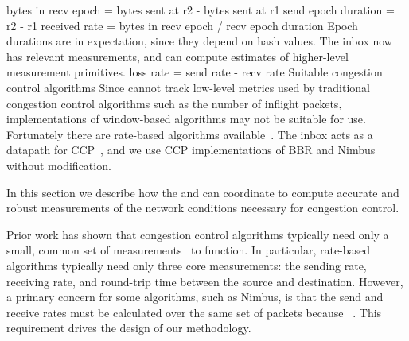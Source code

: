{\begin{outline}
            \4 bytes in recv epoch = bytes sent at r2 - bytes sent at r1
            \4 send epoch duration = r2 - r1
            \4 received rate = bytes in recv epoch / recv epoch duration
        \3 Epoch durations are in expectation, since they depend on hash values.
    \2 The inbox now has relevant measurements, and can compute estimates of higher-level measurement primitives.
        \3 \eg loss rate = send rate - recv rate
\1 Suitable congestion control algorithms
    \2 Since \name cannot track low-level metrics used by traditional congestion control algorithms such as the number of inflight packets, implementations of window-based algorithms may not be suitable for use.
    \2 Fortunately there are rate-based algorithms available~\cite{bbr, nimbus}.
    \2 The inbox acts as a datapath for CCP~\cite{ccp}, and we use CCP implementations of BBR and Nimbus without modification.
\end{outline}
\fi
}

In this section we describe how the \inbox and \outbox can coordinate to compute accurate and robust
measurements of the network conditions necessary for congestion control.

Prior work has shown that congestion control algorithms typically need only a small, common
set of measurements~\cite{ccp-hotnets} to function. In particular, rate-based algorithms typically
need only three core measurements: the sending rate, receiving rate, and round-trip time between
the source and destination. 
However, a primary concern for some algorithms, such as Nimbus, is that the send and receive rates must
be calculated over the same set of packets because ~\cite{nimbus}. 
This requirement drives the design of our methodology.

